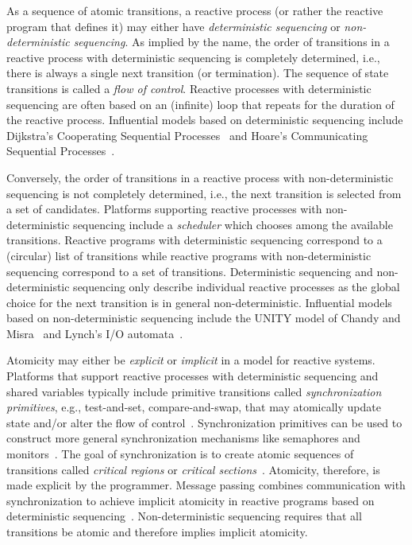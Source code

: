 As a sequence of atomic transitions, a reactive process (or rather the reactive program that defines it) may either have \emph{deterministic sequencing} or \emph{non-deterministic sequencing}.
As implied by the name, the order of transitions in a reactive process with deterministic sequencing is completely determined, i.e., there is always a single next transition (or termination).
The sequence of state transitions is called a \emph{flow of control}.
Reactive processes with deterministic sequencing are often based on an (infinite) loop that repeats for the duration of the reactive process.
Influential models based on deterministic sequencing include Dijkstra's Cooperating Sequential Processes~\cite{dijkstra1965cooperating} and Hoare's Communicating Sequential Processes~\cite{hoare1978communicating}.

Conversely, the order of transitions in a reactive process with non-deterministic sequencing is not completely determined, i.e., the next transition is selected from a set of candidates.
Platforms supporting reactive processes with non-deterministic sequencing include a \emph{scheduler} which chooses among the available transitions.
Reactive programs with deterministic sequencing correspond to a (circular) list of transitions while reactive programs with non-deterministic sequencing correspond to a set of transitions.
Deterministic sequencing and non-deterministic sequencing only describe individual reactive processes as the global choice for the next transition is in general non-deterministic.
Influential models based on non-deterministic sequencing include the UNITY model of Chandy and Misra~\cite{chandy1989parallel} and Lynch's I/O automata~\cite{nancy1996distributed}.

Atomicity may either be \emph{explicit} or \emph{implicit} in a model for reactive systems.
Platforms that support reactive processes with deterministic sequencing and shared variables typically include primitive transitions called \emph{synchronization primitives}, e.g., test-and-set, compare-and-swap, that may atomically update state and/or alter the flow of control~\cite{andrews1983concepts}.
Synchronization primitives can be used to construct more general synchronization mechanisms like semaphores and monitors~\cite{dijkstra1965cooperating}.
The goal of synchronization is to create atomic sequences of transitions called \emph{critical regions} or \emph{critical sections}~\cite{andrews1983concepts}.
Atomicity, therefore, is made explicit by the programmer.
Message passing combines communication with synchronization to achieve implicit atomicity in reactive programs based on deterministic sequencing~\cite{andrews1983concepts}.
Non-deterministic sequencing requires that all transitions be atomic and therefore implies implicit atomicity.


